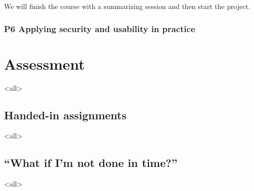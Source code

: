 {We will finish the course with a summarizing session and then start the 
project.

\subsubsection{P6 Applying security and usability in practice}%
\label{devel}

} %


\section{Assessment}%
\label{Assessment}
\mode<all>{}

\subsection{Handed-in assignments}
\mode<all>{}

\subsection{\enquote{What if I'm not done in time?}}%
\label{sec:late}
\mode<all>{}


\printbibliography
